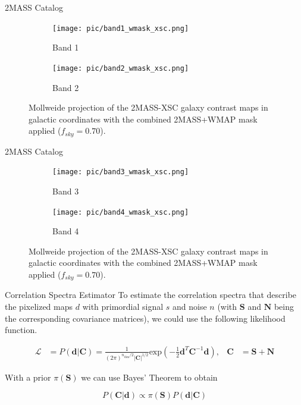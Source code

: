 \documentclass[serif, aspectratio=169]{beamer}
\begin{document}
\begin{frame}{2MASS Catalog}
    \begin{figure}
     \centering
     \begin{subfigure}[t]{0.49\textwidth}
         \centering
         \texttt{[image: pic/band1\_wmask\_xsc.png]}
         \caption{Band 1}
         \label{fig:contrast_map1}
     \end{subfigure}
     \hfill
     \begin{subfigure}[t]{0.49\textwidth}
         \centering
         \texttt{[image: pic/band2\_wmask\_xsc.png]}
         \caption{Band 2}
         \label{fig:contrast_map2}
     \end{subfigure}
     \caption{Mollweide projection of the 2MASS-XSC galaxy contrast maps in galactic coordinates with the combined 2MASS+WMAP mask applied ($f_{sky}=0.70$).}
        \label{fig:2MASS_maps1}
      \end{figure}
\end{frame}

\begin{frame}{2MASS Catalog}
    \begin{figure}
    \centering
        \begin{subfigure}[b]{0.49\textwidth}
             \centering
             \texttt{[image: pic/band3\_wmask\_xsc.png]}
             \caption{Band 3}
             \label{fig:contrast_map3}
        \end{subfigure}
        \hfill
        \begin{subfigure}[b]{0.49\textwidth}
             \centering
             \texttt{[image: pic/band4\_wmask\_xsc.png]}
             \caption{Band 4}
             \label{fig:contrast_map4}
        \end{subfigure}
    \caption{Mollweide projection of the 2MASS-XSC galaxy contrast maps in galactic coordinates with the combined 2MASS+WMAP mask applied ($f_{sky}=0.70$).}
    \label{fig:2MASS_maps2}
    \end{figure}
\end{frame}

\begin{frame}{Correlation Spectra Estimator}
	To estimate the correlation spectra that describe the pixelized maps $d$ with primordial signal $s$ and noise $n$ (with $\mathbf{S}$ and $\mathbf{N}$ being the corresponding covariance matrices), we could use the following likelihood function.

	\begin{align}\label{ch4:Likelihood}
	\mathcal{L}&=P(\mathbf{d}|\mathbf{C})=\frac{1}{(2\pi)^{n_\text{dim}/2}|\mathbf{C}|^{1/2}}\text{exp}\left(-\frac{1}{2}\mathbf{d}^T \mathbf{C}^{-1} \mathbf{d}\right), & \mathbf{C}&=\mathbf{S}+\mathbf{N}
	\end{align}	

	With a prior $\pi(\mathbf{S})$ we can use Bayes' Theorem to obtain
	
	\begin{equation}
	P(\mathbf{C}|\mathbf{d})\propto \pi(\mathbf{S})P(\mathbf{d}|\mathbf{C})
	\end{equation}	 
\end{frame}
\end{document}
